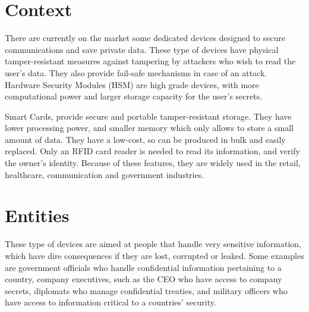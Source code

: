 \cleardoublepage
\label{chap:problem}


\section{Context} \label{chap:problem:context}

There are currently on the market some dedicated devices designed to secure communications and save private data.
These type of devices have physical tamper-resistant measures against tampering by attackers who wish to read the user's data. They also provide fail-safe mechanisms in case of an attack.
Hardware Security Modules (HSM) are high grade devices, with more computational power and larger storage capacity for the user's secrets.

Smart Cards, provide secure and portable tamper-resistant storage.
They have lower processing power, and smaller memory which only allows to store a small amount of data.
They have a low-cost, so can be produced in bulk and easily replaced. Only an RFID card reader is needed to read its information, and verify the owner's identity.
Because of these features, they are widely used in the retail, healthcare, communication and government industries.

\section{Entities} \label{chap:problem:entities}

These type of devices are aimed at people that handle very sensitive information, which have dire consequences if they are lost, corrupted or leaked.
Some examples are government officials who handle confidential information pertaining to a country, company executives, such as the CEO who have access to company secrets, diplomats who manage confidential treaties, and military officers who have access to information critical to a countries' security.

